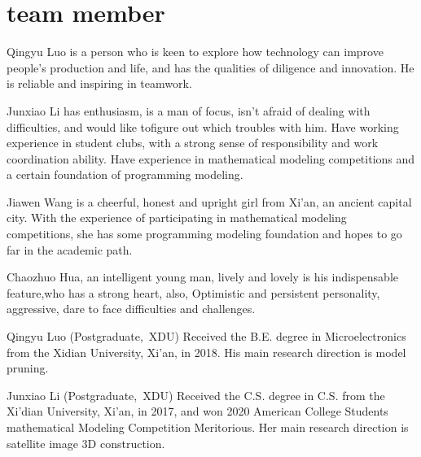 \documentclass[journal]{IEEEtran}
\begin{document}
\section{team member}

Qingyu Luo is a person who is keen to explore how technology can improve people's production and life, and has the qualities of diligence and innovation. He is reliable and inspiring in teamwork.

Junxiao Li has enthusiasm, is a man of focus, isn't afraid of dealing with difficulties, and would like tofigure out which troubles with him. Have working experience in student clubs, with a strong sense of responsibility and work coordination ability. Have experience in mathematical modeling competitions and a certain foundation of programming modeling.

Jiawen Wang is a cheerful, honest and upright girl from Xi'an, an ancient capital city. With the experience of participating in mathematical modeling competitions, she has some programming modeling foundation and hopes to go far in the academic path.

Chaozhuo Hua, an intelligent young man, lively and lovely is his indispensable feature,who has a strong heart, also, Optimistic and persistent personality, aggressive, dare to face difficulties and challenges.





\begin{IEEEbiography}{Qingyu Luo}
(Postgraduate,~XDU) Received the B.E. degree in Microelectronics from the Xidian University, Xi'an, in 2018. His main research direction is model pruning.

\end{IEEEbiography}


 \begin{IEEEbiography}{Junxiao Li}
(Postgraduate,~XDU) Received the
C.S. degree in C.S. from the Xi'dian University, Xi'an, in 2017, and won 2020
American College Students mathematical Modeling
Competition Meritorious. Her main research direction is satellite image 3D construction.
\end{IEEEbiography}
\end{document}
